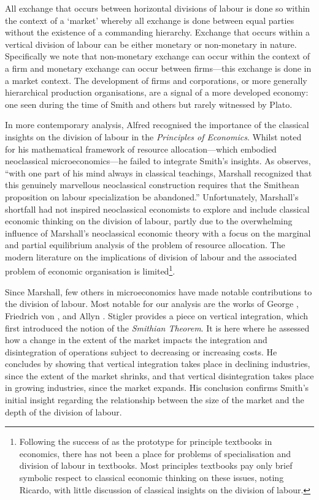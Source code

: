 All exchange that occurs between horizontal divisions of labour is done so within the context of a `market' whereby all exchange is done between equal parties without the existence of a commanding hierarchy. Exchange that occurs within a vertical division of labour can be either monetary or non-monetary in nature. Specifically we note that non-monetary exchange can occur within the context of a firm and monetary exchange can occur between firms---this exchange is done in a market context. The development of firms and corporations, or more generally hierarchical production organisations, are a signal of a more developed economy: one seen during the time of Smith and others but rarely witnessed by Plato.

\medskip \noindent In more contemporary analysis, Alfred \citet{Marshall1890} recognised the importance of the classical insights on the division of labour in the \textit{Principles of Economics}. Whilst noted for his mathematical framework of resource allocation---which embodied neoclassical microeconomics---he failed to integrate Smith's insights. As \citet[p.~6]{BuchananYoon1994} observes, ``with one part of his mind always in classical teachings, Marshall recognized that this genuinely marvellous neoclassical construction requires that the Smithean proposition on labour specialization be abandoned.'' Unfortunately, Marshall's shortfall had not inspired neoclassical economists to explore and include classical economic thinking on the division of labour, partly due to the overwhelming influence of Marshall's neoclassical economic theory with a focus on the marginal and partial equilibrium analysis of the problem of resource allocation. The modern literature on the implications of division of labour and the associated problem of economic organisation is limited\footnote{ Following the success of \citet{Samuelson1948} as the prototype for principle textbooks in economics, there has not been a place for problems of specialisation and division of labour in textbooks. Most principles textbooks pay only brief symbolic respect to classical economic thinking on these issues, noting Ricardo, with little discussion of classical insights on the division of labour.}.

Since Marshall, few others in microeconomics have made notable contributions to the division of labour. Most notable for our analysis are the works of George \citet{Stigler1951}, Friedrich von \citet{Hayek1945}, and Allyn \citet{Young1928}. Stigler provides a piece on vertical integration, which first introduced the notion of the \emph{Smithian Theorem}. It is here where he assessed how a change in the extent of the market impacts the integration and disintegration of operations subject to decreasing or increasing costs. He concludes by showing that vertical integration takes place in declining industries, since the extent of the market shrinks, and that vertical disintegration takes place in growing industries, since the market expands. His conclusion confirms Smith's initial insight regarding the relationship between the size of the market and the depth of the division of labour.

